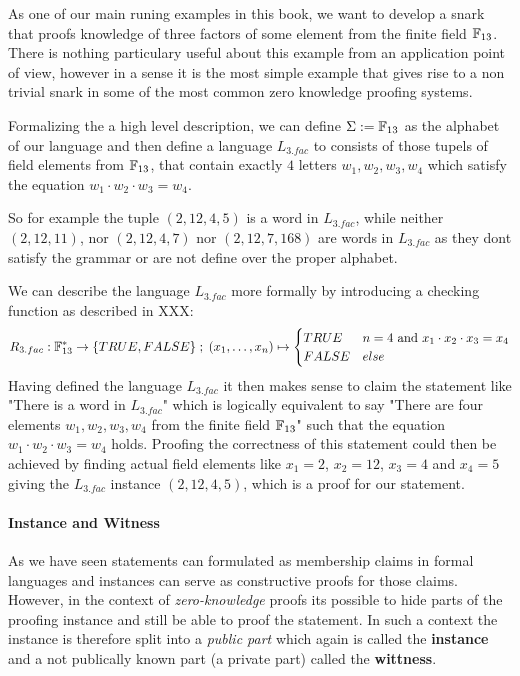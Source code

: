 \begin{example}[3-Factorization]
As one of our main runing examples in this book, we want to develop a snark that proofs knowledge of three factors of some element from the finite field $\mathbb{F}_{13}$. There is nothing particulary useful about this example from an application point of view, however in a sense it is the most simple example that gives rise to a non trivial snark in some of the most common zero knowledge proofing systems. 

Formalizing the a high level description, we can define $\Sigma := \mathbb{F}_{13}$ as the alphabet of our language and then define a language $L_{3.fac}$ to consists of those tupels of field elements from $\mathbb{F}_{13}$, that contain exactly $4$ letters $w_1,w_2,w_3,w_4$ which satisfy the equation $w_1\cdot w_2\cdot w_3 =w_4$.   

So for example the tuple $(2, 12, 4, 5)$ is a word in $L_{3.fac}$, while neither $(2, 12, 11)$, nor $(2, 12, 4, 7)$ nor $(2, 12, 7, 168)$ are words in $L_{3.fac}$ as they dont satisfy the grammar or are not define over the proper alphabet. 

We can describe the language $L_{3.fac}$ more formally by introducing a checking function as described in XXX:
$$
R_{3.fac} : \mathbb{F}_{13}^* \to \{TRUE, FALSE\}\;;\;
(x_1,\ldots,x_n) \mapsto
\begin{cases}
TRUE & n=4 \text{ and } x_1\cdot x_2 \cdot x_3 = x_4\\
FALSE & else
\end{cases}
$$
Having defined the language $L_{3.fac}$ it then makes sense to claim the statement like "There is a word in $L_{3.fac}$" which is logically equivalent to say "There are four elements $w_1,w_2,w_3,w_4$ from the finite field $\mathbb{F}_{13}$" such that the equation $w_1\cdot w_2\cdot w_3 =w_4$ holds. Proofing the correctness of this statement could then be achieved by finding actual field elements like $x_1= 2$, $x_2 =12$, $x_3=4$ and $x_4 = 5$ giving the $L_{3.fac}$ instance $(2,12,4,5)$, which is a proof for our statement.
\end{example}
\paragraph{Instance and Witness}
As we have seen statements can formulated as membership claims in formal languages and instances can serve as constructive proofs for those claims. However, in the context of \textit{zero-knowledge} proofs  its possible to hide parts of the proofing instance and still be able to proof the statement. In such a context the instance is therefore split into a \textit{public part} which again is called the \textbf{instance} and a not publically known part (a private part) called the \textbf{wittness}.

